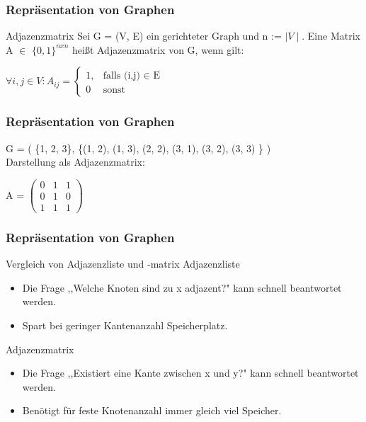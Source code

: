 \documentclass{beamer}
\begin{document}
\begin{frame}
	\frametitle{Repr\"asentation von Graphen}
	\begin{block}{Adjazenzmatrix}
		Sei G = (V, E) ein gerichteter Graph und n := $\mid V \mid$. Eine Matrix A $\in$ $\{0, 1\}^{n x n}$ hei{\ss}t 					Adjazenzmatrix von G, wenn gilt: \\
		\begin{center}
			$\forall i, j \in V : A_{ij} = 
			\begin{cases}
				 1,  & \text{falls (i,j) $\in$ E}\\
				 0  & \text{sonst}
			\end{cases}$
		\end{center}

	\end{block}
\end{frame}

\begin{frame}
	\frametitle{Repräsentation von Graphen}
	\begin{example}
		G = ( \{1, 2, 3\}, \{(1, 2), (1, 3), (2, 2), (3, 1), (3, 2), (3, 3) \} ) \\
		\parskip 12pt
		Darstellung als Adjazenzmatrix:\\
		\begin{center}
		A = $
			\begin{pmatrix}
			  0 & 1 & 1\\
 			  0 & 1 & 0\\
			  1 & 1 & 1
			\end{pmatrix} $
		\end{center}
	\end{example}
\end{frame}

\begin{frame}
	\frametitle{Repr\"asentation von Graphen}
	\begin{block}{Vergleich von Adjazenzliste und -matrix}
	Adjazenzliste \\
	\begin{itemize}
		\item Die Frage ,,Welche Knoten sind zu x adjazent?" kann schnell beantwortet werden.	
		\item Spart bei geringer Kantenanzahl Speicherplatz.
	\end{itemize}
	Adjazenzmatrix \\
	\begin{itemize}
		\item Die Frage ,,Existiert eine Kante zwischen x und y?" kann schnell beantwortet werden.
		\item Ben\"otigt f\"ur feste Knotenanzahl immer gleich viel Speicher.
	\end{itemize}

	\end{block}
\end{frame}
\end{document}
